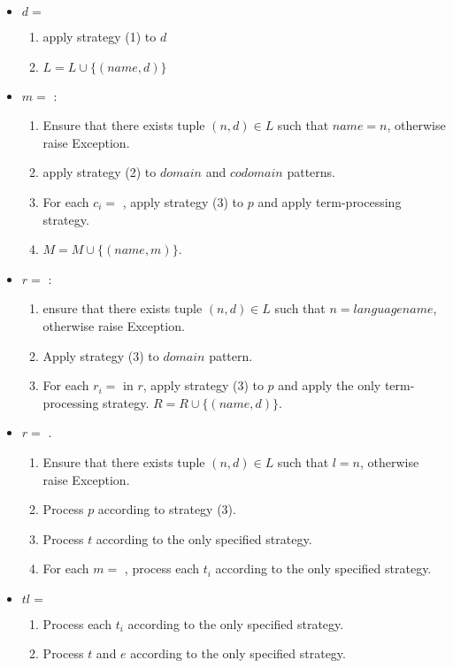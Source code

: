 \begin{itemize}
\item
$d =$ \DefineLanguage 
	\begin{enumerate}
		\item apply strategy (1) to $d$ 
		\item $L = L \cup \{ (name, d) \}$
	\end{enumerate}

\item $m=$ \DefineMetafunction: 
	\begin{enumerate}
	\item Ensure that there exists tuple $(n, d) \in L$ such that $name=n$, otherwise raise Exception.
	\item apply strategy (2) to $domain$ and $codomain$ patterns.
	\item For each $c_i=$ \MetafunctionCase, apply strategy (3) to $p$ and apply term-processing strategy. 
	\item $M = M \cup \{ (name, m) \}$. 
	\end{enumerate}

\item $r=$ \DefineReductionRelation: 
\begin{enumerate}
\item ensure that there exists tuple $(n, d) \in L$ such that $n=languagename$, otherwise raise Exception.
\item Apply strategy (3) to $domain$ pattern. 
\item For each $r_i=$ \ReductionCase in $r$, apply strategy (3) to $p$ and apply the only term-processing strategy. $R = R \cup \{ (name, d) \}$.
\end{enumerate}


\item 
$r=$ \RedexMatchAssertEqual. 
	\begin{enumerate}
	\item Ensure that there exists tuple $(n, d) \in L$ such that $l=n$, otherwise raise Exception.
	\item Process $p$ according to strategy (3). 
	\item Process $t$ according to the only specified strategy.
	\item For each $m=$ \Match, process each $t_i$ according to the only specified strategy.
	\end{enumerate}

\item $tl=$ \TermLetAssertEqual
	\begin{enumerate}
	\item  Process each $t_i$ according to the only specified strategy.
	\item Process $t$ and $e$ according to the only specified strategy.
	\end{enumerate}


\end{itemize}
